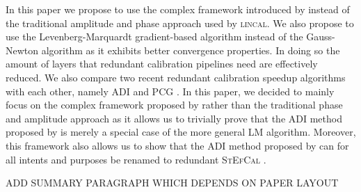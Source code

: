 \documentclass[useAMS,usenatbib]{mn2e}
\begin{document}
In this paper we propose to use the complex framework introduced by \citet{Smirnov2015} instead of the traditional amplitude and phase approach used by \textsc{lincal}.
We also propose to use the Levenberg-Marquardt gradient-based algorithm instead of the Gauss-Newton algorithm as it exhibits better convergence properties.
In doing so the amount of layers that redundant calibration pipelines need are effectively reduced. We also compare two recent redundant calibration speedup algorithms
with each other, namely ADI \citep{Marthi2014} and PCG \citep{Liu2010}. In this paper, we decided to mainly focus on the complex framework proposed by \citet{Smirnov2015} rather than the traditional phase and amplitude approach as it 
allows us to trivially prove that the ADI method proposed by \citep{Marthi2014} is merely a special case of the more general LM algorithm. Moreover, this framework also 
allows us to show that the ADI method proposed by \citep{Marthi2014} can for all intents and purposes be renamed to redundant \textsc{StEfCal} \citep{Mitchell:MWA-cal,Salvini2014}. 

ADD SUMMARY PARAGRAPH WHICH DEPENDS ON PAPER LAYOUT
\end{document}
